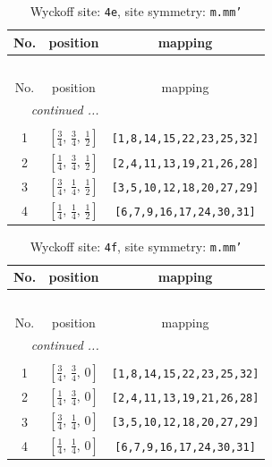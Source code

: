 \documentclass[fleqn,8pt]{jsarticle}
\begin{document}
\begin{longtable}{ccc}
\caption{Wyckoff site: {\tt 4e}, site symmetry: {\tt m.mm'}}
 \\
 \hline \hline
No. & position & mapping \\ \hline \endfirsthead

\multicolumn{2}{l}{\tablename\ \thetable{}} \\
 \hline \hline
No. & position & mapping \\ \hline \endhead

 \hline \hline
\multicolumn{2}{r}{\footnotesize\it continued ...} \\ \endfoot

 \hline \hline
\multicolumn{2}{r}{} \\ \endlastfoot

1 & $\left[ \frac{3}{4},\, \frac{3}{4},\, \frac{1}{2} \right]$ & {\tt [1,8,14,15,22,23,25,32]} \\ \hline
2 & $\left[ \frac{1}{4},\, \frac{3}{4},\, \frac{1}{2} \right]$ & {\tt [2,4,11,13,19,21,26,28]} \\ \hline
3 & $\left[ \frac{3}{4},\, \frac{1}{4},\, \frac{1}{2} \right]$ & {\tt [3,5,10,12,18,20,27,29]} \\ \hline
4 & $\left[ \frac{1}{4},\, \frac{1}{4},\, \frac{1}{2} \right]$ & {\tt [6,7,9,16,17,24,30,31]} \\
\end{longtable}
\renewcommand{\arraystretch}{1.2}
\begin{longtable}{ccc}
\caption{Wyckoff site: {\tt 4f}, site symmetry: {\tt m.mm'}}
 \\
 \hline \hline
No. & position & mapping \\ \hline \endfirsthead

\multicolumn{2}{l}{\tablename\ \thetable{}} \\
 \hline \hline
No. & position & mapping \\ \hline \endhead

 \hline \hline
\multicolumn{2}{r}{\footnotesize\it continued ...} \\ \endfoot

 \hline \hline
\multicolumn{2}{r}{} \\ \endlastfoot

1 & $\left[ \frac{3}{4},\, \frac{3}{4},\, 0 \right]$ & {\tt [1,8,14,15,22,23,25,32]} \\ \hline
2 & $\left[ \frac{1}{4},\, \frac{3}{4},\, 0 \right]$ & {\tt [2,4,11,13,19,21,26,28]} \\ \hline
3 & $\left[ \frac{3}{4},\, \frac{1}{4},\, 0 \right]$ & {\tt [3,5,10,12,18,20,27,29]} \\ \hline
4 & $\left[ \frac{1}{4},\, \frac{1}{4},\, 0 \right]$ & {\tt [6,7,9,16,17,24,30,31]} \\
\end{longtable}
\end{document}

